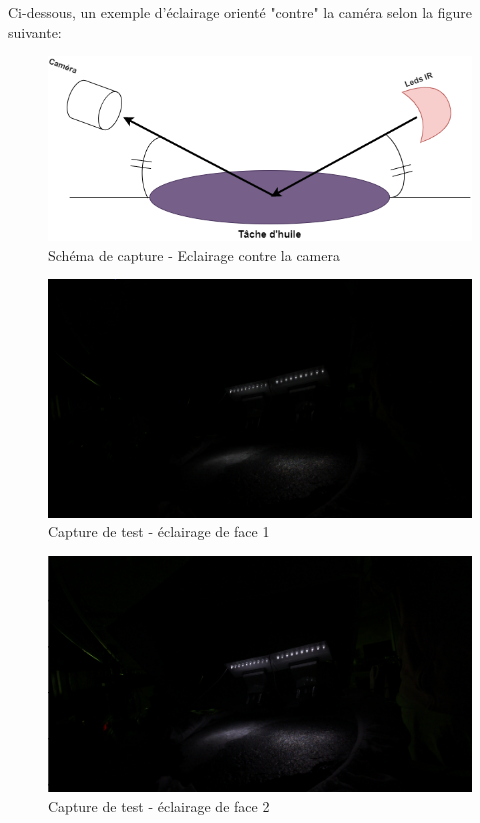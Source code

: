 Ci-dessous, un exemple d'éclairage orienté "contre" la caméra selon la figure suivante:
\begin{figure}[H]
    \centering
    \includegraphics[width=13cm]{assets/figures/eclairage_contre_camera.png}
    \caption{Schéma de capture - Eclairage contre la camera \label{led_perp}}
\end{figure}


\begin{figure}[H]
    \centering
    \includegraphics[width=13cm]{assets/figures/eclairage_face1.png}
    \caption{Capture de test - éclairage de face 1}
\end{figure}
\begin{figure}[H]
    \centering
    \includegraphics[width=13cm]{assets/figures/eclairage_face2.png}
    \caption{Capture de test - éclairage de face 2}
\end{figure}

